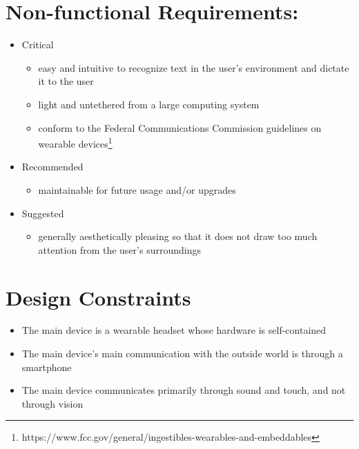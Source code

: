 \section{Non-functional Requirements:}
\begin{itemize}
\item Critical
	\begin{itemize}
	\item easy and intuitive to recognize text in the user's environment and dictate it to the user
	\item light and untethered from a large computing system
	\item conform to the Federal Communications Commission guidelines on wearable devices\footnote{https://www.fcc.gov/general/ingestibles-wearables-and-embeddables}
    \end{itemize}
\item Recommended
	\begin{itemize}
	\item maintainable for future usage and/or upgrades
	\end{itemize}
\item Suggested
    \begin{itemize}
	\item generally aesthetically pleasing so that it does not draw too much attention from the user's surroundings
	\end{itemize}
\end{itemize}

\section{Design Constraints}
\begin{itemize}
\item The main device is a wearable headset whose hardware is self-contained
\item The main device's main communication with the outside world is through a smartphone
\item The main device communicates primarily through sound and touch, and not through vision
\end{itemize}
